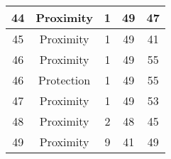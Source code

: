 \documentclass[results.tex]{subfiles}
\begin{document}
\begin{center}
\begin{tabular}{| c || c | c | c | c |}
    \hline
    44 & Proximity & 1 & 49 & 47 \\ 
    \hline
    45 & Proximity & 1 & 49 & 41 \\ 
    \hline
    46 & Proximity & 1 & 49 & 55 \\ 
    \hline
    46 & Protection & 1 & 49 & 55 \\ 
    \hline
    47 & Proximity & 1 & 49 & 53 \\ 
    \hline
    48 & Proximity & 2 & 48 & 45 \\ 
    \hline
    49 & Proximity & 9 & 41 & 49 \\ 
    \hline   \end{tabular}
\end{center}
\end{document}
